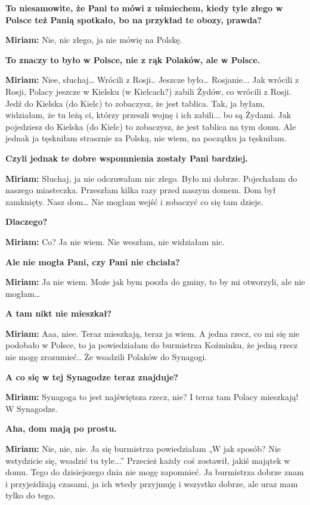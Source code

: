 \textbf{To niesamowite, że Pani to mówi z uśmiechem, kiedy tyle złego w Polsce też Panią spotkało, bo na przykład te obozy, prawda?} 

\textbf{Miriam:} Nie, nic złego, ja nie mówię na Polskę. 

\textbf{To znaczy to było w Polsce, nie z rąk Polaków, ale w Polsce.} 

\textbf{Miriam:} Niee, słuchaj… Wrócili z Rosji.. Jeszcze było… Rosjanie... Jak wrócili z Rosji, Polacy jeszcze  w Kielsku (w Kielcach?) zabili Żydów, co wrócili z Rosji. Jedź do Kielska (do Kielc) to zobaczysz, że jest tablica. Tak, ja byłam, widziałam, że tu leżą ci, którzy przeszli wojnę i ich zabili... bo są Żydami. Jak pojedziesz do Kielska (do Kielc) to zobaczysz, że jest tablica na tym domu. Ale jednak ja tęskniłam strasznie za Polską, nie wiem, na początku ja tęskniłam. 

\textbf{Czyli jednak te dobre wspomnienia zostały Pani bardziej.} 

\textbf{Miriam:} Słuchaj, ja nie odczuwałam nic złego. Było mi dobrze. Pojechałam do naszego miasteczka. Przeszłam kilka razy przed naszym domem. Dom był zamknięty. Nasz dom… Nie mogłam wejść i zobaczyć co się tam dzieje. 

\textbf{Dlaczego?} 

\textbf{Miriam:} Co? Ja nie wiem. Nie weszłam, nie widziałam nic. 

\textbf{Ale nie mogła Pani, czy Pani nie chciała?} 

\textbf{Miriam:} Ja nie wiem. Może jak bym poszła do gminy, to by mi otworzyli, ale nie mogłam… 

\textbf{A tam nikt nie mieszkał?}

\textbf{Miriam:} Aaa, niee. Teraz mieszkają, teraz ja wiem. A jedna rzecz, co mi się nie podobało w Polsce, to ja powiedziałam do burmistrza Koźminku, że jedną rzecz nie mogę zrozumieć.. Że wsadzili Polaków do Synagogi. 

\textbf{A co się w tej Synagodze teraz znajduje?} 

\textbf{Miriam:} Synagoga to jest najświętsza rzecz, nie? I teraz tam Polacy mieszkają! W Synagodze. 

\textbf{Aha, dom mają po prostu.} 

\textbf{Miriam:} Nie, nie, nie. Ja się burmistrza powiedziałam „W jak sposób? Nie wstydzicie się, wsadzić tu tyle...” Przecież każdy coś zostawił, jakiś majątek w domu. Tego do dzisiejszego dnia nie mogę zapomnieć. Ja burmistrza dobrze znam i przyjeżdżają czasami, ja ich wtedy przyjmuję i wszystko dobrze, ale uraz mam tylko do tego. 

